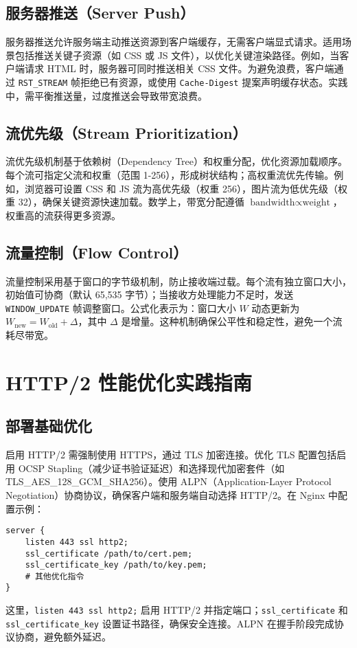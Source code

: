 \section{服务器推送（Server Push）}
服务器推送允许服务端主动推送资源到客户端缓存，无需客户端显式请求。适用场景包括推送关键子资源（如 CSS 或 JS 文件），以优化关键渲染路径。例如，当客户端请求 HTML 时，服务器可同时推送相关 CSS 文件。为避免浪费，客户端通过 \texttt{RST\_{}STREAM} 帧拒绝已有资源，或使用 \texttt{Cache-Digest} 提案声明缓存状态。实践中，需平衡推送量，过度推送会导致带宽浪费。\par
\section{流优先级（Stream Prioritization）}
流优先级机制基于依赖树（Dependency Tree）和权重分配，优化资源加载顺序。每个流可指定父流和权重（范围 1-256），形成树状结构；高权重流优先传输。例如，浏览器可设置 CSS 和 JS 流为高优先级（权重 256），图片流为低优先级（权重 32），确保关键资源快速加载。数学上，带宽分配遵循 $\text{bandwidth} \propto \text{weight}$，权重高的流获得更多资源。\par
\section{流量控制（Flow Control）}
流量控制采用基于窗口的字节级机制，防止接收端过载。每个流有独立窗口大小，初始值可协商（默认 65,535 字节）；当接收方处理能力不足时，发送 \texttt{WINDOW\_{}UPDATE} 帧调整窗口。公式化表示为：窗口大小 $W$ 动态更新为 $W_{\text{new}} = W_{\text{old}} + \Delta$，其中 $\Delta$ 是增量。这种机制确保公平性和稳定性，避免一个流耗尽带宽。\par
\chapter{HTTP/2 性能优化实践指南}
\section{部署基础优化}
启用 HTTP/2 需强制使用 HTTPS，通过 TLS 加密连接。优化 TLS 配置包括启用 OCSP Stapling（减少证书验证延迟）和选择现代加密套件（如 TLS\_{}AES\_{}128\_{}GCM\_{}SHA256）。使用 ALPN（Application-Layer Protocol Negotiation）协商协议，确保客户端和服务端自动选择 HTTP/2。在 Nginx 中配置示例：\par
\begin{lstlisting}[language=nginx]
server {
    listen 443 ssl http2;
    ssl_certificate /path/to/cert.pem;
    ssl_certificate_key /path/to/key.pem;
    # 其他优化指令
}
\end{lstlisting}
这里，\texttt{listen 443 ssl http2;} 启用 HTTP/2 并指定端口；\texttt{ssl\_{}certificate} 和 \texttt{ssl\_{}certificate\_{}key} 设置证书路径，确保安全连接。ALPN 在握手阶段完成协议协商，避免额外延迟。\par
